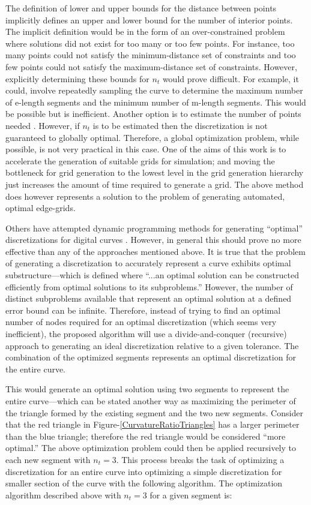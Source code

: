 The definition of lower and upper bounds for the distance between points 
implicitly defines an upper and lower bound for the number of interior 
points. The implicit definition would be in the form of an 
over-constrained problem where solutions did not exist for too many or too 
few points. For instance, too many points could not satisfy the 
minimum-distance set of constraints and too few points could not satisfy 
the maximum-distance set of constraints. However, explicitly determining 
these bounds for $n_t$ would prove difficult. For example, it could, 
involve repeatedly sampling the curve to determine the maximum number of 
e-length segments and the minimum number of m-length segments. This would 
be possible but is inefficient. Another option is to estimate the number 
of points needed \cite{cuilliere97}. However, if $n_t$ is to be estimated 
then the discretization is not guaranteed to globally optimal. Therefore, 
a global optimization problem, while possible, is not 
very practical in this case. One of the aims of this work is to 
accelerate the generation of suitable grids for simulation; and moving the 
bottleneck for grid generation to the lowest level in the grid generation 
hierarchy just increases the amount of time required to generate a grid. 
The above method does however represents a solution to the problem of 
generating automated, optimal edge-grids.

Others have attempted dynamic programming methods for generating ``optimal'' discretizations for digital curves \cite{horng02}. However, in general this should prove no more effective than any of the approaches mentioned above. It is true that the problem of generating a discretization to accurately represent a curve exhibits optimal substructure—which is defined where ``...an optimal solution can be constructed efficiently from optimal solutions to its subproblems.'' \cite{cormen01} However, the number of distinct subproblems available that represent an optimal solution at a defined error bound can be infinite. Therefore, instead of trying to find an optimal number of nodes required for an optimal discretization (which seems very inefficient), the proposed algorithm will use a divide-and-conquer (recursive) approach to generating an ideal discretization relative to a given tolerance. The combination of the optimized segments represents an optimal discretization for the entire curve.

This would generate an optimal solution using two segments to represent the entire curve—which can be stated another way as maximizing the perimeter of the triangle formed by the existing segment and the two new segments. Consider that the red triangle in Figure-\ref{CurvatureRatioTriangles} has a larger perimeter than the blue triangle; therefore the red triangle would be considered ``more optimal.'' The above optimization problem could then be applied recursively to each new segment with $n_t=3$. This process breaks the task of optimizing a discretization for an entire curve into optimizing a simple discretization for smaller section of the curve with the following algorithm. The optimization algorithm described above with $n_t=3$ for a given segment is:

